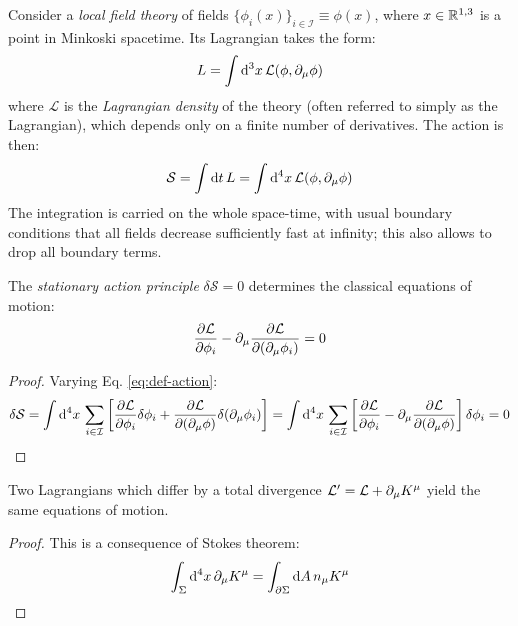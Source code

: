 Consider a \textit{local field theory} of fields $ \{\phi_i(x)\}_{i \in \mathcal{I}} \equiv \phi(x) $, where $ x \in \mathbb{R}^{1,3} $ is a point in Minkoski spacetime. Its Lagrangian takes the form:
\begin{equation}
  L = \int \mathrm{d}^3 x\, \mathcal{L}(\phi, \partial_\mu \phi)
\end{equation}
where $ \mathcal{L} $ is the \textit{Lagrangian density} of the theory (often referred to simply as the Lagrangian), which depends only on a finite number of derivatives. The action is then:
\begin{equation}
  \mathcal{S} = \int \mathrm{d} t\, L = \int \mathrm{d}^4 x\, \mathcal{L}(\phi, \partial_\mu \phi)
  \label{eq:def-action}
\end{equation}
The integration is carried on the whole space-time, with usual boundary conditions that all fields decrease sufficiently fast at infinity; this also allows to drop all boundary terms.

\begin{theorem}{}{}
  The \textit{stationary action principle} $ \delta \mathcal{S} = 0 $ determines the classical equations of motion:
  \begin{equation}
    \frac{\partial \mathcal{L}}{\partial \phi_i} - \partial_\mu \frac{\partial \mathcal{L}}{\partial (\partial_\mu \phi_i)} = 0
  \end{equation}

  \tcblower

  \begin{proof}
    Varying Eq. \ref{eq:def-action}:
    \begin{equation*}
      \delta \mathcal{S} = \int \mathrm{d}^4 x\, \sum_{i \in \mathcal{I}} \left[ \frac{\partial \mathcal{L}}{\partial \phi_i} \delta \phi_i + \frac{\partial \mathcal{L}}{\partial (\partial_\mu \phi)} \delta (\partial_\mu \phi_i) \right] = \int \mathrm{d}^4 x\, \sum_{i \in \mathcal{I}} \left[ \frac{\partial \mathcal{L}}{\partial \phi_i} - \partial_\mu \frac{\partial \mathcal{L}}{\partial (\partial_\mu \phi)} \right] \delta \phi_i = 0
    \end{equation*}
  \end{proof}
\end{theorem}

\begin{corollary}{}{}
  Two Lagrangians which differ by a total divergence $ \mathcal{L}' = \mathcal{L} + \partial_\mu K^\mu $ yield the same equations of motion.

  \tcblower

  \begin{proof}
    This is a consequence of Stokes theorem:
    \begin{equation*}
      \int_\Sigma \mathrm{d}^4 x\, \partial_\mu K^\mu = \int_{\partial \Sigma} \mathrm{d} A\, n_\mu K^\mu
    \end{equation*}
  \end{proof}
\end{corollary}

